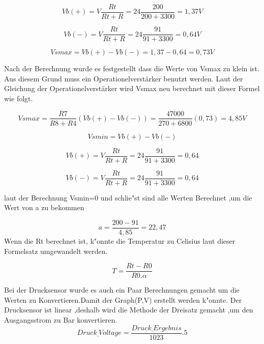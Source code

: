 \begin{equation}\label{eq:paran}
 Vb(+) = V\frac{Rt}{Rt+R} =24 \frac{200}{200+3300} = 1,37 V
\end{equation}

\begin{equation}\label{eq:paran}
 Vb(-) = V\frac{Rt}{Rt+R} =24 \frac{91}{91+3300} = 0,64 V
\end{equation}

\begin{equation}\label{eq:paran}
 Vsmax = Vb(+) - Vb(-) =1,37 -0,64= 0,73 V
\end{equation}

Nach der Berechnung wurde es festgestellt dass die Werte von Vsmax zu klein ist. 
Aus diesem Grund muss ein Operationelverstärker benutzt werden.
Laut der Gleichung der Operationelverstärker wird Vsmax neu berechnet mit dieser Formel wie folgt.

\begin{equation}\label{eq:paran}
 Vsmax = \frac{R7}{R8+R4}(Vb(+)-Vb(-)) =\frac{47000}{270+6800}(0,73) = 4,85 V
\end{equation}


\begin{equation}\label{eq:paran}
 Vsmin =  Vb(+) - Vb(-)
\end{equation}

\begin{equation}\label{eq:paran}
 Vb(+) = V\frac{Rt}{Rt+R} =24\frac{91}{91+3300}=0,64
\end{equation}


\begin{equation}\label{eq:paran}
 Vb(-) = V\frac{Rt}{Rt+R} =24\frac{91}{91+3300}=0,64
\end{equation}

laut der Berechnung Vsmin=0 und schlie"st sind alle Werten Berechnet ,um die Wert von a zu bekommen 

\begin{equation}\label{eq:paran}
a = \frac{200-91}{4,85} =22,47
\end{equation}
Wenn die Rt berechnet ist, k"onnte die Temperatur zu Celisius laut dieser Formelsatz umgewandelt werden.

\begin{equation}\label{eq:paran}
T = \frac{Rt -R0}{R0.\alpha}
\end{equation}

Bei der Drucksensor wurde es  auch ein Paar Berechnungen gemacht um die 
Werten zu Konvertieren.Damit der Graph(P,V) erstellt werden k"onnte. 
Der Drucksensor ist linear ,deshalb wird die Methode der Dreisatz gemacht ,um den Ausgangsstrom zu Bar konvertieren.
\begin{equation}\label{eq:paran}
Druck\underline{\ }Voltage = \frac{Druck\underline{\ }Ergebnis}{1023}.5
\end{equation}

